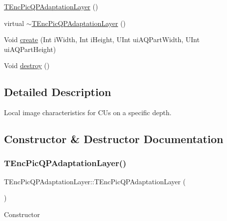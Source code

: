 {\bf }\par
\begin{DoxyCompactItemize}
\item 
\hyperlink{class_t_enc_pic_q_p_adaptation_layer_a9cdea96c71d79e32cfece567f2af5019}{T\+Enc\+Pic\+Q\+P\+Adaptation\+Layer} ()
\item 
virtual \hyperlink{class_t_enc_pic_q_p_adaptation_layer_a0de53a60564d7d4bc6fc2acb528027ac}{$\sim$\+T\+Enc\+Pic\+Q\+P\+Adaptation\+Layer} ()
\item 
Void \hyperlink{class_t_enc_pic_q_p_adaptation_layer_a36fe963d2fb4ee684132e9883b7571fc}{create} (Int i\+Width, Int i\+Height, U\+Int ui\+A\+Q\+Part\+Width, U\+Int ui\+A\+Q\+Part\+Height)
\item 
Void \hyperlink{class_t_enc_pic_q_p_adaptation_layer_aa80e503a39d9bf9bef177d75de35a4cb}{destroy} ()
\end{DoxyCompactItemize}



\subsection{Detailed Description}
Local image characteristics for C\+Us on a specific depth. 

\subsection{Constructor \& Destructor Documentation}
\mbox{\label{class_t_enc_pic_q_p_adaptation_layer_a9cdea96c71d79e32cfece567f2af5019}} 
\subsubsection{\texorpdfstring{T\+Enc\+Pic\+Q\+P\+Adaptation\+Layer()}{TEncPicQPAdaptationLayer()}}
{\footnotesize\ttfamily T\+Enc\+Pic\+Q\+P\+Adaptation\+Layer\+::\+T\+Enc\+Pic\+Q\+P\+Adaptation\+Layer (\begin{DoxyParamCaption}{ }\end{DoxyParamCaption})}

Constructor \mbox{\label{class_t_enc_pic_q_p_adaptation_layer_a0de53a60564d7d4bc6fc2acb528027ac}} 
